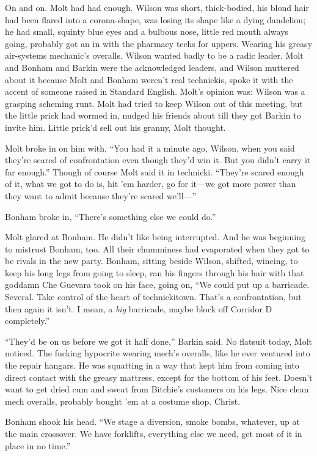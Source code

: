 On and on. Molt had had enough. Wilson was short, thick-bodied, his blond hair had been flared into a corona-shape, was losing its shape like a dying dandelion; he had small, squinty blue eyes and a bulbous nose, little red mouth always going, probably got an in with the pharmacy techs for uppers. Wearing his greasy air-systems mechanic's overalls. Wilson wanted badly to be a radic leader. Molt and Bonham and Barkin were the acknowledged leaders, and Wilson muttered about it because Molt and Bonham weren't real technickis, spoke it with the accent of someone raised in Standard English. Molt's opinion was: Wilson was a grasping scheming runt. Molt had tried to keep Wilson out of this meeting, but the little prick had wormed in, nudged his friends about till they got Barkin to invite him. Little prick'd sell out his granny, Molt thought.

Molt broke in on him with, ``You had it a minute ago, Wilson, when you said they're scared of confrontation even though they'd win it. But you didn't carry it far enough.'' Though of course Molt said it in technicki. ``They're scared enough of it, what we got to do is, hit 'em harder, go for it---we got more power than they want to admit because they're scared we'll---''

Bonham broke in, ``There's something else we could do.''

Molt glared at Bonham. He didn't like being interrupted. And he was beginning to mistrust Bonham, too. All their chumminess had evaporated when they got to be rivals in the new party. Bonham, sitting beside Wilson, shifted, wincing, to keep his long legs from going to sleep, ran his fingers through his hair with that goddamn Che Guevara took on his face, going on, ``We could put up a barricade. Several. Take control of the heart of technickitown. That's a confrontation, but then again it isn't. I mean, a \textit{big} barricade, maybe block off Corridor D completely.''

``They'd be on us before we got it half done,'' Barkin said. No flatsuit today, Molt noticed. The fucking hypocrite wearing mech's overalls, like he ever ventured into the repair hangars. He was squatting in a way that kept him from coming into direct contact with the greasy mattress, except for the bottom of his feet. Doesn't want to get dried cum and sweat from Bitchie's customers on his legs. Nice clean mech overalls, probably bought 'em at a costume shop. Christ.

Bonham shook his head. ``We stage a diversion, smoke bombs, whatever, up at the main crossover. We have forklifts, everything else we need, get most of it in place in no time.''

